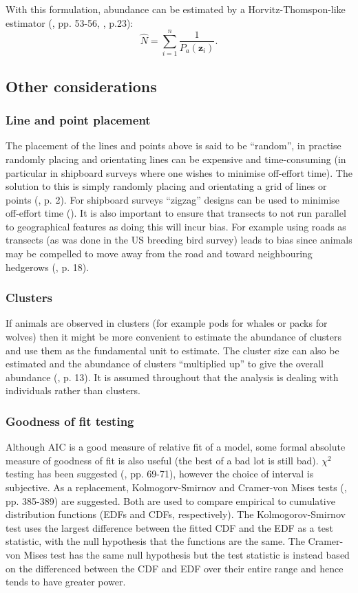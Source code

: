 With this formulation, abundance can be estimated by a Horvitz-Thomspon-like estimator (\cite{thompson}, pp. 53-56, \cite{ADS}, p.23):
\begin{equation}
\hat{N} = \sum_{i=1}^n \frac{1}{P_a(\bm{z}_i)}.
\end{equation}

\subsection{Other considerations}
\subsubsection{Line and point placement}
The placement of the lines and points above is said to be ``random'', in practise randomly placing and orientating lines can be expensive and time-consuming (in particular in shipboard surveys where one wishes to minimise off-effort time). The solution to this is simply randomly placing and orientating a grid of lines or points (\cite{IDS}, p. 2). For shipboard surveys ``zigzag'' designs can be used to minimise off-effort time (\cite{strindberg04}). It is also important to ensure that transects to not run parallel to geographical features as doing this will incur bias. For example using roads as transects (as was done in the US breeding bird survey) leads to bias since animals may be compelled to move away from the road and toward neighbouring hedgerows (\cite{IDS}, p. 18).

\subsubsection{Clusters}
If animals are observed in clusters (for example pods for whales or packs for wolves) then it might be more convenient to estimate the abundance of clusters and use them as the fundamental unit to estimate. The cluster size can also be estimated and the abundance of clusters ``multiplied up'' to give the overall abundance (\cite{IDS}, p. 13). It is assumed throughout that the analysis is dealing with individuals rather than clusters.

\subsubsection{Goodness of fit testing}
Although AIC is a good measure of relative fit of a model, some formal absolute measure of goodness of fit is also useful (the best of a bad lot is still bad). $\chi^2$ testing has been suggested (\cite{IDS}, pp. 69-71), however the choice of interval is subjective. As a replacement, Kolmogorv-Smirnov and Cramer-von Mises tests (\cite{ADS}, pp. 385-389) are suggested. Both are used to compare empirical to cumulative distribution functions (EDFs and CDFs, respectively). The Kolmogorov-Smirnov test uses the largest difference between the fitted CDF and the EDF as a test statistic, with the null hypothesis that the functions are the same. The Cramer-von Mises test has the same null hypothesis but the test statistic is instead based on the differenced between the CDF and EDF over their entire range and hence tends to have greater power.

